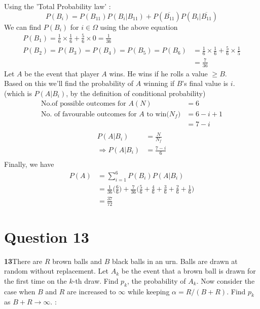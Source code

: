 \documentclass{article}
\begin{document}
    Using the 'Total Probability law' :
\begin{equation*}
    P(B_i) = P(B_{11})P(B_i|B_{11}) + P(\overline{B_{11}})P(B_i|\overline{B_{11}})
\end{equation*}
We can find $P(B_i)$ for $i\in \Omega$ using the above equation
\begin{align*}
    P(B_1)=\frac{1}{6}\times\frac{1}{6}+\frac{5}{6}\times0=\frac{1}{36}\\
    P(B_2)=P(B_3)=P(B_4)=P(B_5)=P(B_6)&=\frac{1}{6}\times\frac{1}{6}+\frac{5}{6}\times\frac{1}{5}\\
    &=\frac{7}{36}
\end{align*}
Let $A$ be the event that player $A$ wins. He wins if he rolls a value $\geq B$.\\
Based on this we'll find the probability of $A$ winning if $B$'s final value is $i$.\\(which is $P(A|B_i)$, by the definition of conditional probability)\\
\begin{align*}
    \text{No.of possible outcomes for $A(N)$} &= 6\\
    \text{No. of favourable outcomes for $A$ to win($N_f$)} &= 6-i+1\\
    &= 7-i\\
\end{align*}
\begin{align*}
    P(A|B_i) &= \frac{N}{N_f}\\
    \Rightarrow P(A|B_i) &= \frac{7-i}{6}\\
\end{align*}
Finally, we have
\begin{align*}
    P(A)&=\sum^6_{i=1} P(B_i)P(A|B_i)\\
    &= \frac{1}{36}\Big(\frac{6}{6}\Big)+\frac{7}{36}\Big(\frac{5}{6}+\frac{4}{6}+\frac{3}{6}+\frac{2}{6}+\frac{1}{6}\Big)\\
    &=\frac{37}{72}
\end{align*}

\section{Question 13}
\label{Q13}
\textbf{13}There are $R$ brown balls and $B$ black balls in an urn. Balls are drawn at random without replacement. Let $A_k$ be the event that a brown ball is drawn for the first time on the $k$-th draw. Find $p_k$, the probability of $A_k$. Now consider the case when $B$ and $R$ are increased to $\infty$ while keeping $\alpha = R/(B + R).$ Find $p_k$ as $B + R \rightarrow \infty$. : \\
\end{document}
